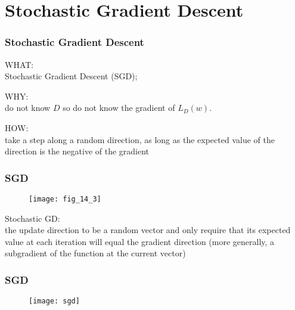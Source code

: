 \section{Stochastic Gradient Descent}

\begin{frame}
\frametitle{Stochastic Gradient Descent}

WHAT:\\
Stochastic Gradient Descent (SGD);

WHY:\\
do not know $D$ so do not know the gradient of $L_D(w)$.

HOW:\\
take a step along a random direction, as long as
the expected value of the direction is the negative of the gradient

\end{frame}

\begin{frame}
\frametitle{SGD}

\begin{figure}
    \centering
    \texttt{[image: fig\_14\_3]}
\end{figure}

Stochastic GD:\\
the update direction to be a random vector and
only require that its expected value at each iteration will equal the gradient direction
(more generally, a subgradient of the function at the current vector)

\end{frame}

\begin{frame}
\frametitle{SGD}

\begin{figure}
    \centering
    \texttt{[image: sgd]}
\end{figure}

\end{frame}
